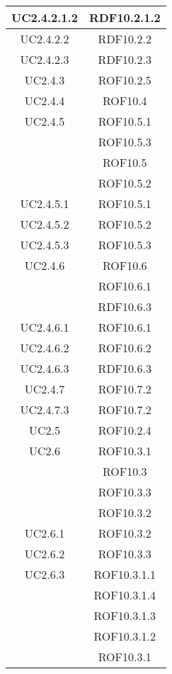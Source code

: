 \begin{longtable}{|c|c|}
\midrule
UC2.4.2.1.2
& RDF10.2.1.2\\

\midrule
UC2.4.2.2
& RDF10.2.2\\

\midrule
UC2.4.2.3
& RDF10.2.3\\

\midrule
UC2.4.3
& ROF10.2.5\\

\midrule
UC2.4.4
& ROF10.4\\

\midrule
UC2.4.5
& ROF10.5.1\\
& ROF10.5.3\\
& ROF10.5\\
& ROF10.5.2\\

\midrule
UC2.4.5.1
& ROF10.5.1\\

\midrule
UC2.4.5.2
& ROF10.5.2\\

\midrule
UC2.4.5.3
& ROF10.5.3\\

\midrule
UC2.4.6
& ROF10.6\\
& ROF10.6.1\\
& RDF10.6.3\\

\midrule
UC2.4.6.1
& ROF10.6.1\\

\midrule
UC2.4.6.2
& ROF10.6.2\\

\midrule
UC2.4.6.3
& RDF10.6.3\\

\midrule
UC2.4.7
& ROF10.7.2\\

\midrule
UC2.4.7.3
& ROF10.7.2\\

\midrule
UC2.5
& ROF10.2.4\\

\midrule
UC2.6
& ROF10.3.1\\
& ROF10.3\\
& ROF10.3.3\\
& ROF10.3.2\\

\midrule
UC2.6.1
& ROF10.3.2\\

\midrule
UC2.6.2
& ROF10.3.3\\

\midrule
UC2.6.3
& ROF10.3.1.1\\
& ROF10.3.1.4\\
& ROF10.3.1.3\\
& ROF10.3.1.2\\
& ROF10.3.1\\


\end{longtable}
